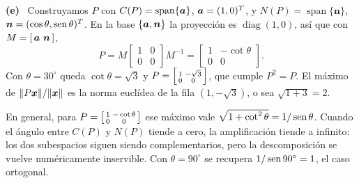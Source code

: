 \documentclass[11pt,a4paper]{article}
\newcommand{\bi}[1]{\boldsymbol{#1}}
\DeclareMathOperator{\gen}{span}
\DeclareMathOperator{\diag}{diag}
\newcommand{\itemsol}[1]{\par\medskip\noindent\textbf{(#1)}\ \ignorespaces}
\begin{document}
\itemsol{e} Construyamos $P$ con $C(P)=\gen\{\ba\}$, $\ba=(1,0)^T$, y
$N(P)=\gen\{\bi{n}\}$, $\bi{n}=(\cos\theta,\sen\theta)^T$. En la base
$\{\ba,\bi{n}\}$ la proyección es $\diag(1,0)$, así que con $M=[\,\ba\ \bi{n}\,]$,
\[
P=M\begin{bmatrix}1&0\\ 0&0\end{bmatrix}M^{-1}
 =\begin{bmatrix}1&-\cot\theta\\ 0&0\end{bmatrix}.
\]
Con $\theta=30^\circ$ queda $\cot\theta=\sqrt3$ y
$P=\begin{bsmallmatrix}1&-\sqrt3\\0&0\end{bsmallmatrix}$, que cumple $P^2=P$. El
máximo de $\|P\bx\|/\|\bx\|$ es la norma euclídea de la fila $(1,-\sqrt3)$, o
sea $\sqrt{1+3}=2$.

En general, para $P=\begin{bsmallmatrix}1&-\cot\theta\\0&0\end{bsmallmatrix}$
ese máximo vale $\sqrt{1+\cot^2\theta}=1/\operatorname{sen}\theta$. Cuando el ángulo entre
$C(P)$ y $N(P)$ tiende a cero, la amplificación tiende a infinito: los dos
subespacios siguen siendo complementarios, pero la descomposición se vuelve
numéricamente inservible. Con $\theta=90^\circ$ se recupera $1/\operatorname{sen}90^\circ=1$,
el caso ortogonal.
\end{document}
